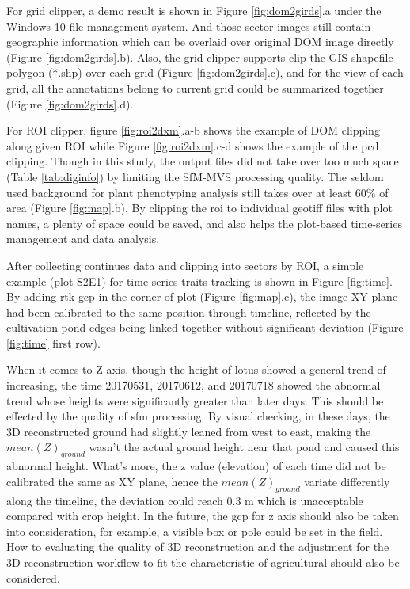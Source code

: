 \documentclass{configs/bmcart}
\begin{document}
For grid clipper, a demo result is shown in Figure \ref{fig:dom2girds}.a under the Windows 10 file management system. And those sector images still contain geographic information which can be overlaid over original DOM image directly (Figure \ref{fig:dom2girds}.b). Also, the grid clipper supports clip the GIS shapefile polygon (*.shp) over each grid (Figure \ref{fig:dom2girds}.c), and for the view of each grid, all the annotations belong to current grid could be summarized together (Figure \ref{fig:dom2girds}.d).

For ROI clipper, figure \ref{fig:roi2dxm}.a-b shows the example of DOM clipping along given ROI while Figure \ref{fig:roi2dxm}.c-d shows the example of the \acrshort*{pcd} clipping. Though in this study, the output files did not take over too much space (Table \ref{tab:diginfo}) by limiting the SfM-MVS processing quality. The seldom used background for plant phenotyping analysis still takes over at least 60\% of area (Figure \ref{fig:map}.b). By clipping the \acrshort*{roi} to individual geotiff files with plot names, a plenty of space could be saved, and also helps the plot-based time-series management and data analysis. 

After collecting continues data and clipping into sectors by ROI, a simple example (plot S2E1) for time-series traits tracking is shown in Figure \ref{fig:time}. By adding \acrfull*{rtk} \acrshort*{gcp} in the corner of plot (Figure \ref{fig:map}.c), the image XY plane had been calibrated to the same position through timeline, reflected by the cultivation pond edges being linked together without significant deviation (Figure \ref{fig:time} first row). 

When it comes to Z axis, though the height of lotus showed a general trend of increasing, the time 20170531, 20170612, and 20170718 showed the abnormal trend whose heights were significantly greater than later days. This should be effected by the quality of \acrshort*{sfm} processing. By visual checking, in these days, the 3D reconstructed ground had slightly leaned from west to east, making the $mean(Z)_{ground}$ wasn't the actual ground height near that pond and caused this abnormal height. What's more, the z value (elevation) of each time did not be calibrated the same as XY plane, hence the $mean(Z)_{ground}$ variate differently along the timeline, the deviation could reach 0.3 m which is unacceptable compared with crop height. In the future, the \acrshort*{gcp} for z axis should also be taken into consideration, for example, a visible box or pole could be set in the field. How to evaluating the quality of 3D reconstruction and the adjustment for the 3D reconstruction workflow to fit the characteristic of agricultural should also be considered.
\end{document}
